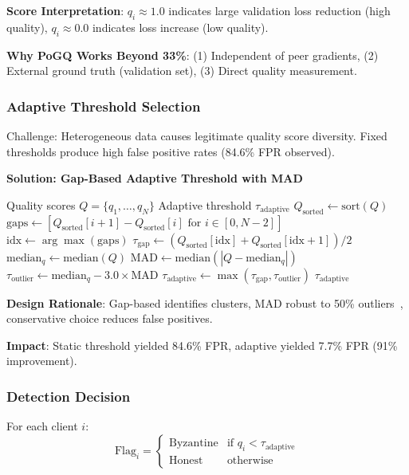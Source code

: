 \textbf{Score Interpretation}: $q_i \approx 1.0$ indicates large validation loss reduction (high quality), $q_i \approx 0.0$ indicates loss increase (low quality).

\textbf{Why PoGQ Works Beyond 33\%}: (1) Independent of peer gradients, (2) External ground truth (validation set), (3) Direct quality measurement.

\subsubsection{Adaptive Threshold Selection}

Challenge: Heterogeneous data causes legitimate quality score diversity. Fixed thresholds produce high false positive rates (84.6\% FPR observed).

\textbf{Solution: Gap-Based Adaptive Threshold with MAD}

\begin{algorithm}[h]
\caption{Adaptive Threshold Selection}
\begin{algorithmic}[1]
\REQUIRE Quality scores $Q = \{q_1, \ldots, q_N\}$
\ENSURE Adaptive threshold $\tau_{\text{adaptive}}$
\STATE $Q_{\text{sorted}} \gets \text{sort}(Q)$
\STATE $\text{gaps} \gets [Q_{\text{sorted}}[i+1] - Q_{\text{sorted}}[i] \text{ for } i \in [0, N-2]]$
\STATE $\text{idx} \gets \arg\max(\text{gaps})$
\STATE $\tau_{\text{gap}} \gets (Q_{\text{sorted}}[\text{idx}] + Q_{\text{sorted}}[\text{idx}+1]) / 2$
\STATE $\text{median}_q \gets \text{median}(Q)$
\STATE $\text{MAD} \gets \text{median}(|Q - \text{median}_q|)$
\STATE $\tau_{\text{outlier}} \gets \text{median}_q - 3.0 \times \text{MAD}$
\STATE $\tau_{\text{adaptive}} \gets \max(\tau_{\text{gap}}, \tau_{\text{outlier}})$
\RETURN $\tau_{\text{adaptive}}$
\end{algorithmic}
\end{algorithm}

\textbf{Design Rationale}: Gap-based identifies clusters, MAD robust to 50\% outliers~\cite{rousseeuw1993alternatives}, conservative choice reduces false positives.

\textbf{Impact}: Static threshold yielded 84.6\% FPR, adaptive yielded 7.7\% FPR (91\% improvement).

\subsubsection{Detection Decision}

For each client $i$:
\begin{equation}
\text{Flag}_i = \begin{cases}
\text{Byzantine} & \text{if } q_i < \tau_{\text{adaptive}} \\
\text{Honest} & \text{otherwise}
\end{cases}
\end{equation}

